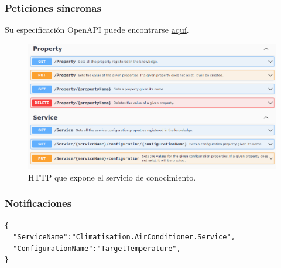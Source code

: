 \subsubsection{Peticiones síncronas}

Su especificación OpenAPI puede encontrarse \href{https://github.com/Starkie/TFM-DistributedAutoadaptiveSystems/blob/1db95346290cb55edbfd5efb717785bcd06def79/src/AutoAdaptativeSystem/AdaptionLoop/Knowledge/Knowledge.Service-OpenAPISpec.json}{aquí}.

\begin{figure}[h!]
  \hspace{-0.25cm}
  \includegraphics[scale=0.45]{anx_apis/images/apis-knowledge}
  \caption{ HTTP que expone el servicio de conocimiento.}
\end{figure}

\pagebreak

\subsubsection{Notificaciones}

\newsavebox\configurationchangedeventbox
\begin{lrbox}{\configurationchangedeventbox}
  \begin{minipage}[t]{2in}
    \begin{verbatim}
{
  "ServiceName":"Climatisation.AirConditioner.Service",
  "ConfigurationName":"TargetTemperature",
}
        \end{verbatim}
  \end{minipage}
\end{lrbox}

